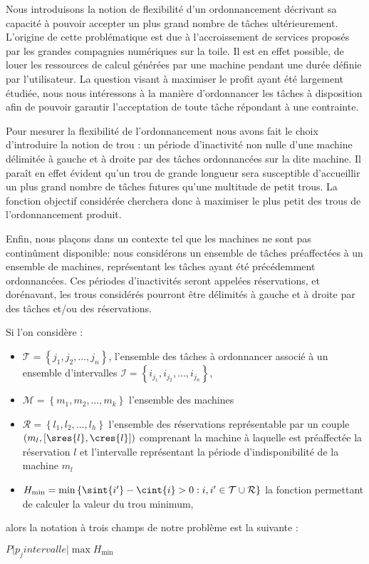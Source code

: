 \documentclass[a4paper,11pt]{report}
\begin{document}
Nous introduisons la notion de flexibilité d'un ordonnancement décrivant
sa capacité à pouvoir accepter un plus grand nombre de tâches ultérieurement. L'origine de cette
problématique est due à l'accroissement de services proposés par les grandes compagnies numériques
sur la toile. Il est en effet possible, de louer les ressources de calcul générées par une machine
pendant une durée définie par l'utilisateur. La question visant à maximiser le profit ayant été
largement étudiée, nous nous intéressons à la manière d'ordonnancer les tâches à disposition afin de
pouvoir garantir l'acceptation de toute tâche répondant à une contrainte. 

Pour mesurer la flexibilité de l'ordonnancement nous avons fait le choix d'introduire la notion de
trou : un période d'inactivité non nulle d'une machine délimitée à gauche et à droite par des tâches
ordonnancées sur la dite machine. Il paraît en effet évident qu'un trou de grande longueur sera
susceptible d'accueillir un plus grand nombre de tâches futures qu'une multitude de petit trous.
La fonction objectif considérée cherchera donc à maximiser le plus petit des trous de
l'ordonnancement produit.

Enfin, nous plaçons dans un contexte tel que les machines ne sont pas continûment disponible: nous
considérons un ensemble de tâches préaffectées à un ensemble de machines, représentant les tâches
ayant été précédemment ordonnancées. Ces périodes d'inactivités
seront appelées réservations, et dorénavant, les trous considérés pourront être délimités à gauche
et à droite par des tâches et/ou des réservations.

Si l'on considère :
\begin{itemize}
    \item $\mathcal{T} = \left\{ j_1, j_2, \dots, j_n \right\}$, l'ensemble des tâches à ordonnancer
        associé à un ensemble d'intervalles $\mathcal{I} = \left\{ i_{j_1}, i_{j_2}, \dots,
        i_{j_n} \right\}$,
    \item $\mathcal{M} = \left\{ m_1, m_2, \dots, m_k \right\}$ l'ensemble des machines 
    \item $\mathcal{R} = \left\{ l_1, l_2, \dots, l_h \right\}$ l'ensemble des réservations
        représentable par un couple $\left( m_l, \left[ \sres{l}, \cres{l} \right] \right)$
        comprenant la machine à laquelle est préaffectée la réservation $l$ et l'intervalle
        représentant la période d'indisponibilité de la machine $m_l$
    \item $H_{\min} = \min \left\{ \sint{i'} - \cint{i} > 0 : i, i' \in \mathcal{T} \cup
        \mathcal{R} \right\}$ la fonction permettant de calculer la valeur du trou minimum,
\end{itemize}
alors la notation à trois champs de notre problème est la suivante :
\begin{center}
    $P \Big| p_j intervalle \Big| \max H_{\min}$
\end{center}
\end{document}
